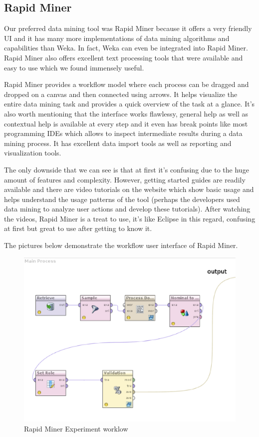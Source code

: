\subsection{Rapid Miner} %
\label{sub:Rapid Miner}
Our preferred data mining tool was Rapid Miner because it offers a very friendly UI and it has many more implementations of data mining algorithms and capabilities than Weka. In fact, Weka can even be integrated into Rapid Miner. Rapid Miner also offers excellent text processing tools that were available and easy to use which we found immensely useful.

Rapid Miner provides a workflow model where each process can be dragged and dropped on a canvas and then connected using arrows. It helps visualize the entire data mining task and provides a quick overview of the task at a glance. It's also worth mentioning that the interface works flawlessy, general help as well as contextual help is available at every step and it even has break points like most programming IDEs which allows to inspect intermediate results during a data mining process. It has excellent data import tools as well as reporting and visualization tools.

The only downside that we can see is that at first it's confusing due to the huge amount of features and complexity. However, getting started guides are readily available and there are video tutorials on the website which show basic usage and helps understand the usage patterns of the tool (perhaps the developers used data mining to analyze user actions and develop these tutorials). After watching the videos, Rapid Miner is a treat to use, it's like Eclipse in this regard, confusing at first but great to use after getting to know it.

The pictures below demonstrate the workflow user interface of Rapid Miner.

\begin{figure}[!hbp]
\begin{center}
    \includegraphics[scale=0.5]{rapidMiner-process}
\caption{\label{pic:st_art}  Rapid Miner Experiment worklow}
\end{center}
\end{figure}

